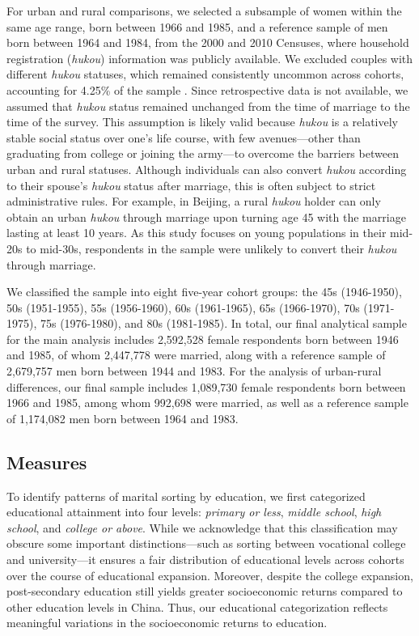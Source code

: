 For urban and rural comparisons, we selected a subsample of women within the same age range, born between 1966 and 1985, and a reference sample of men born between 1964 and 1984, from the 2000 and 2010 Censuses, where household registration (\textit{hukou}) information was publicly available. We excluded couples with different \textit{hukou} statuses, which remained consistently uncommon across cohorts, accounting for 4.25\% of the sample \parencite{duTrendsEducationalAssortative2023}. Since retrospective data is not available, we assumed that \textit{hukou} status remained unchanged from the time of marriage to the time of the survey. This assumption is likely valid because \textit{hukou} is a relatively stable social status over one's life course, with few avenues—other than graduating from college or joining the army—to overcome the barriers between urban and rural statuses. Although individuals can also convert \textit{hukou} according to their spouse's \textit{hukou} status after marriage, this is often subject to strict administrative rules. For example, in Beijing, a rural \textit{hukou} holder can only obtain an urban \textit{hukou} through marriage upon turning age 45 with the marriage lasting at least 10 years. As this study focuses on young populations in their mid-20s to mid-30s, respondents in the sample were unlikely to convert their \textit{hukou} through marriage.

We classified the sample into eight five-year cohort groups: the 45s (1946-1950), 50s (1951-1955), 55s (1956-1960), 60s (1961-1965), 65s (1966-1970), 70s (1971-1975), 75s (1976-1980), and 80s (1981-1985). In total, our final analytical sample for the main analysis includes 2,592,528 female respondents born between 1946 and 1985, of whom 2,447,778 were married, along with a reference sample of 2,679,757 men born between 1944 and 1983. For the analysis of urban-rural differences, our final sample includes 1,089,730 female respondents born between 1966 and 1985, among whom 992,698 were married, as well as a reference sample of 1,174,082 men born between 1964 and 1983.

\subsection{Measures}

To identify patterns of marital sorting by education, we first categorized educational attainment into four levels: \textit{primary or less}, \textit{middle school}, \textit{high school}, and \textit{college or above}. While we acknowledge that this classification may obscure some important distinctions—such as sorting between vocational college and university—it ensures a fair distribution of educational levels across cohorts over the course of educational expansion. Moreover, despite the college expansion, post-secondary education still yields greater socioeconomic returns compared to other education levels in China. Thus, our educational categorization reflects meaningful variations in the socioeconomic returns to education.

